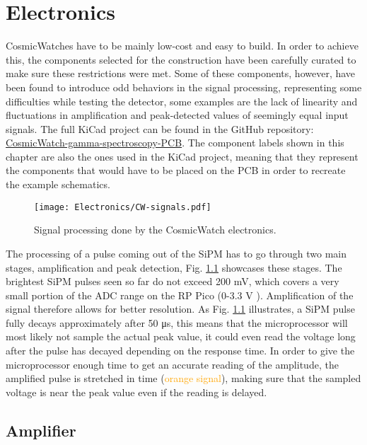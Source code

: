 \chapter{Electronics}
\label{chap:Electronics}

CosmicWatches have to be mainly low-cost and easy to build. In order to achieve this, the components selected for the construction have been carefully curated to make sure these restrictions were met. Some of these components, however, have been found to introduce odd behaviors in the signal processing, representing some difficulties while testing the detector, some examples are the lack of linearity and fluctuations in amplification and peak-detected values of seemingly equal input signals. The full KiCad project can be found in the GitHub repository: \href{https://github.com/anvargasl/CosmicWatch-gamma-spectroscopy-PCB}{CosmicWatch-gamma-spectroscopy-PCB}. The component labels shown in this chapter are also the ones used in the KiCad project, meaning that they represent the components that would have to be placed on the PCB in order to recreate the example schematics.

\begin{figure}[H]
    \centering
    \texttt{[image: Electronics/CW-signals.pdf]}
    \caption{Signal processing done by the CosmicWatch electronics.}
    \label{fig:signal_processing}
\end{figure}

The processing of a pulse coming out of the SiPM has to go through two main stages, amplification and peak detection, Fig. \ref{fig:signal_processing} showcases these stages. The brightest SiPM pulses seen so far do not exceed 200 mV, which covers a very small portion of the ADC range on the RP Pico (0-3.3 V \cite[p.~18]{datasheet2024rp2040}). Amplification of the signal therefore allows for better resolution. As Fig. \ref{fig:signal_processing} illustrates, a SiPM pulse fully decays approximately after 50 \unit{\micro\s}, this means that the microprocessor will most likely not sample the actual peak value, it could even read the voltage long after the pulse has decayed depending on the response time. In order to give the microprocessor enough time to get an accurate reading of the amplitude, the amplified pulse is stretched in time (\textcolor{orange}{orange signal}), making sure that the sampled voltage is near the peak value even if the reading is delayed.

\section{Amplifier}

